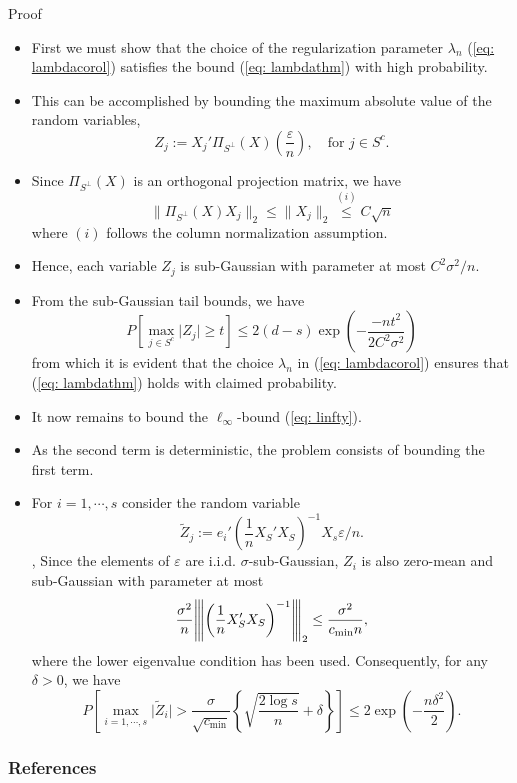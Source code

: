 \documentclass[10pt,handout,english]{beamer}
\newcommand{\vertiii}[1]{{\left\vert\kern-0.25ex\left\vert\kern-0.25ex\left\vert #1 
    \right\vert\kern-0.25ex\right\vert\kern-0.25ex\right\vert}}
\begin{document}
\begin{frame}[allowframebreaks]{Proof}
\begin{itemize}
\item First we must show that the choice of the regularization parameter $\lambda_n$ (\ref{eq: lambdacorol}) satisfies the bound (\ref{eq: lambdathm}) with high probability.\justifying
\item This can be accomplished by bounding the maximum absolute value of the random variables,\justifying
\[
Z_j:=X_j'\Pi_{S^{\perp}}(X)\left(\frac{\varepsilon}{n}\right),\quad \text{for }j\in S^c.
\]
\item Since $\Pi_{S^{\perp}}(X)$ is an orthogonal projection matrix, we have\justifying
\[
\lVert\Pi_{S^{\perp}}(X)X_j\rVert_2\leq \lVert X_j\rVert_2\overset{(i)}{\leq} C\sqrt{n}
\]
where $(i)$ follows the column normalization assumption. 
\item Hence, each variable $Z_j$ is sub-Gaussian with parameter at most $C^2\sigma^2/n$.\justifying 
\item From the sub-Gaussian tail bounds, we have\justifying
\[
P\left[\max_{j\in S^{c}}\lvert Z_j\rvert\geq t\right]\leq 2(d-s)\exp\left(-\frac{-nt^2}{2C^2\sigma^2}\right)
\]
from which it is evident that the choice $\lambda_n$ in (\ref{eq: lambdacorol}) ensures that (\ref{eq: lambdathm}) holds with claimed probability.\justifying
\item It now remains to bound the $\ell_{\infty}$-bound (\ref{eq: linfty}).\justifying
\item As the second term is deterministic, the problem consists of bounding the first term.\justifying 
\item For $i=1,\cdots,s$ consider the random variable\justifying 
\[
\tilde{Z}_j:=e_i'\left(\frac{1}{n}X_S'X_S\right)^{-1}X_s \varepsilon/n.
\], 
Since the elements of $\varepsilon$ are i.i.d. $\sigma$-sub-Gaussian, $Z_i$ is also zero-mean and sub-Gaussian with parameter at most\justifying
\[
\frac{\sigma^2}{n}\vertiii{\left(\frac{1}{n}X_S'X_S\right)^{-1}}_2\leq \frac{\sigma^2}{c_{\min}n}, 
\] 
where the lower eigenvalue condition has been used. Consequently, for any $\delta>0$, we have\justifying
\[
P\left[\max_{i=1,\cdots,s}\lvert\tilde{Z}_i\rvert>\frac{\sigma}{\sqrt{c_{\min}}}\left\{\sqrt{\frac{2\log s}{n}}+\delta\right\}\right]\leq2\exp\left(-\frac{n\delta^2}{2}\right).
\]
\end{itemize}
\end{frame}

\begin{frame}[allowframebreaks]
\frametitle{References}


\end{frame}
\end{document}

